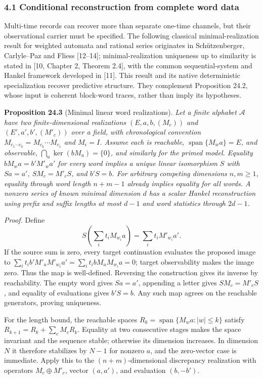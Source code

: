 \documentclass[
]{article}
\begin{document}
\hypertarget{conditional-reconstruction-from-complete-word-data}{%
\subsubsection{4.1 Conditional reconstruction from complete word
data}\label{conditional-reconstruction-from-complete-word-data}}

Multi-time records can recover more than separate one-time channels, but
their observational carrier must be specified. The following classical
minimal-realization result for weighted automata and rational series
originates in Schützenberger, Carlyle--Paz and Fliess {[}12--14{]};
minimal-realization uniqueness up to similarity is stated in {[}10,
Chapter 2, Theorem 2.4{]}, with the common sequential-system and Hankel
framework developed in {[}11{]}. This result and its native
deterministic specialization recover predictive structure. They
complement Proposition 24.2, whose input is coherent block-word traces,
rather than imply its hypotheses.

\textbf{Proposition 24.3} (Minimal linear word realizations). \emph{Let
a finite alphabet \(\mathcal A\) have two finite-dimensional
realizations \((E,a,b,(M_c))\) and \((E',a',b',(M'_c))\) over a field,
with chronological convention
\(M_{c_1\cdots c_k}=M_{c_k}\cdots M_{c_1}\) and \(M_\epsilon=I\). Assume
each is reachable, \(\operatorname{span}\{M_wa\}=E\), and observable,
\(\bigcap_u\ker(bM_u)=\{0\}\), and similarly for the primed model.
Equality \(bM_wa=b'M'_wa'\) for every word implies a unique linear
isomorphism \(S\) with \(Sa=a'\), \(SM_c=M'_cS\), and \(b'S=b\). For
arbitrary competing dimensions \(n,m\ge1\), equality through word length
\(n+m-1\) already implies equality for all words. A nonzero series of
known minimal dimension \(d\) has a scalar Hankel reconstruction using
prefix and suffix lengths at most \(d-1\) and word statistics through
\(2d-1\).}

\emph{Proof.} Define \[
S\!\left(\sum_i t_iM_{w_i}a\right)=\sum_i t_iM'_{w_i}a'.
\] If the source sum is zero, every target continuation evaluates the
proposed image to
\(\sum_i t_i b'M'_uM'_{w_i}a'=\sum_i t_i bM_uM_{w_i}a=0\); target
observability makes the image zero. Thus the map is well-defined.
Reversing the construction gives its inverse by reachability. The empty
word gives \(Sa=a'\), appending a letter gives \(SM_c=M'_cS\), and
equality of evaluations gives \(b'S=b\). Any such map agrees on the
reachable generators, proving uniqueness.

For the length bound, the reachable spaces
\(R_k=\operatorname{span}\{M_wa:|w|\le k\}\) satisfy
\(R_{k+1}=R_k+\sum_cM_cR_k\). Equality at two consecutive stages makes
the space invariant and the sequence stable; otherwise its dimension
increases. In dimension \(N\) it therefore stabilizes by \(N-1\) for
nonzero \(a\), and the zero-vector case is immediate. Apply this to the
\((n+m)\)-dimensional discrepancy realization with operators
\(M_c\oplus M'_c\), vector \((a,a')\), and evaluation \((b,-b')\).
\end{document}
